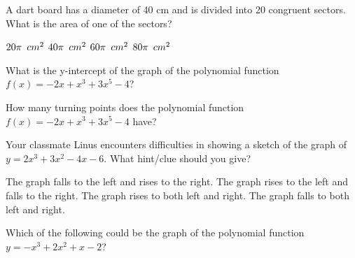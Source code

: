 \begin{questions}
\question A dart board has a diameter of 40 cm and is divided into 20 congruent       sectors. What is the area of one of the sectors?    
\begin{multicols}{4}
\begin{choices}  
\choice $20\pi \hspace{0.5em} cm^2$
\choice $40\pi \hspace{0.5em} cm^2$
\choice $60\pi \hspace{0.5em} cm^2$
\choice $80\pi \hspace{0.5em} cm^2$
\end{choices}
\end{multicols} 

\question What is the y-intercept of the graph of the polynomial function $f(x) = -2x + x^3 + 3x^5 -4$?

\begin{multicols}{4}
\begin{choices}  
\end{choices}
\end{multicols} 

\question How many turning points does the polynomial function $f(x) = -2x + x^3 + 3x^5 - 4$ have?

\begin{multicols}{4}
\begin{choices}  
\end{choices}
\end{multicols} 

\question Your classmate Linus encounters difficulties in showing a sketch of the graph of  $y = 2x^3 + 3x^2 - 4x - 6$. What hint/clue should you give? 

\begin{choices} 
\CorrectChoice The graph falls to the left and rises to the right. 
\choice The graph rises to the left and falls to the right.
\choice The graph rises to both left and right. 
\choice The graph falls to both left and right. 
\end{choices}

\question Which of the following could be the graph of the polynomial function $y = -x^3 + 2x^2 + x - 2$?

\begin{multicols}{4}
\begin{choices}  
\choice  
\CorrectChoice  
\choice  
\choice  
\end{choices}
\end{multicols} 


\end{questions}
